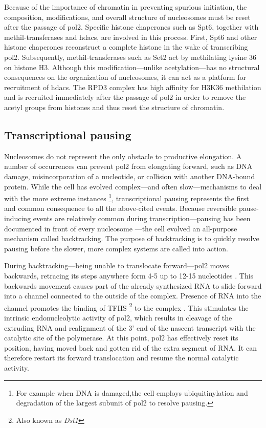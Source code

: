 Because of the importance of chromatin in preventing spurious initiation, the composition, modifications, and overall structure of nucleosomes must be reset after the passage of \gls{pol2}. 
Specific histone chaperones such as Spt6, together with methil-transferases and \gls{hdacs}, are involved in this process.
First, Spt6 and other histone chaperones reconstruct a complete histone in the wake of transcribing \gls{pol2}.
Subsequently, methil-transferases such as Set2 act by methilating lysine 36 on histone H3. 
Although this modification---unlike acetylation---has no structural consequences on the organization of nucleosomes, it can act as a platform for recruitment of \gls{hdacs}.
The RPD3 complex has high affinity for H3K36 methilation and is recruited immediately after the passage of \gls{pol2} in order to remove the acetyl groups from histones and thus reset the structure of chromatin.

\subsection{Transcriptional pausing}
Nucleosomes do not represent the only obstacle to productive elongation.
A number of occurrences can prevent \gls{pol2} from elongating forward, such as DNA damage, misincorporation of a nucleotide, or collision with another DNA-bound protein.
While the cell has evolved complex---and often slow---mechanisms to deal with the more extreme instances \footnote{For example when DNA is damaged,the cell employs ubiquitinylation and degradation of the largest subunit of \gls{pol2} to resolve pausing.}, transcriptional pausing represents the first and common consequence to all the above-cited events. 
Because reversible pause-inducing events are relatively common during transcription---pausing has been documented in front of every nucleosome \citep{churchman:2011:nascent}---the cell evolved an all-purpose mechanism called backtracking.
The purpose of backtracking is to quickly resolve pausing before the slower, more complex systems are called into action. 

During backtracking---being unable to translocate forward---\gls{pol2} moves backwards, retracing its steps anywhere form 4-5 up to 12-15 nucleotides \citep{cheung:2011:structural}.
This backwards movement causes part of the already synthesized RNA to slide forward into a channel connected to the outside of the complex.
Presence of RNA into the channel promotes the binding of TFIIS \footnote{Also known as \emph{Dst1}} to the complex \citep{cheung:2011:structural}.
This stimulates the intrinsic endonucleolytic activity of \gls{pol2}, which results in cleavage of the extruding RNA and realignment of the 3' end of the nascent transcript with the catalytic site of the polymerase.
At this point, \gls{pol2} has effectively reset its position, having moved back and gotten rid of the extra segment of RNA. 
It can therefore restart its forward translocation and resume the normal catalytic activity.

